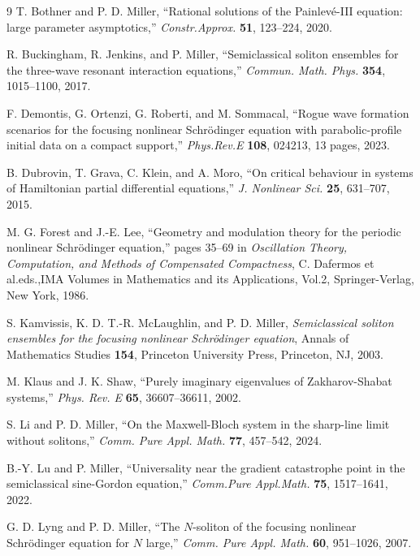 \documentclass[12pt]{amsart}
\numberwithin{equation}{section}
\begin{document}
\begin{thebibliography}{9}
T. Bothner and P. D. Miller,
``Rational solutions of the Painlev\'e-III equation:  large parameter asymptotics,''
\textit{Constr.\@ Approx.\@}
\textbf{51},
123--224,
2020.

R. Buckingham, R. Jenkins, and P. Miller, 
``Semiclassical soliton ensembles for the three-wave resonant interaction equations,''
\textit{Commun. Math. Phys.}
\textbf{354}, 1015--1100, 2017.

F. Demontis, G. Ortenzi, G. Roberti, and M. Sommacal,
``Rogue wave formation scenarios for the focusing nonlinear Schr\"odinger equation with parabolic-profile initial data on a compact support,''
\textit{Phys.\@ Rev.\@ E}
\textbf{108}, 
024213, 13 pages, 2023.

B. Dubrovin, T. Grava, C. Klein, and A. Moro, ``On critical behaviour in systems of Hamiltonian partial differential equations,'' \textit{J. Nonlinear Sci.\@} \textbf{25}, 631--707, 2015.

M. G. Forest and J.-E. Lee, ``Geometry and modulation theory for the periodic nonlinear Schr\"odinger equation,'' pages 35--69 in \textit{Oscillation Theory, Computation, and Methods of Compensated Compactness}, C. Dafermos et al.\@ eds.,\@ IMA Volumes in Mathematics and its Applications, Vol.\@ 2, Springer-Verlag, New York, 1986.

S. Kamvissis, K. D. T.-R. McLaughlin, and P. D. Miller, 
\textit{Semiclassical soliton ensembles for the focusing nonlinear Schr\"odinger equation},
Annals of Mathematics Studies 
\textbf{154},
Princeton University Press, 
Princeton, NJ, 
2003.

M. Klaus and J. K. Shaw, 
``Purely imaginary eigenvalues of Zakharov-Shabat systems,'' 
\textit{Phys. Rev. E} \textbf{65}, 36607--36611, 2002.

S. Li and P. D. Miller,
``On the Maxwell-Bloch system in the sharp-line limit without solitons,''
\textit{Comm. Pure Appl. Math.} \textbf{77}, 457--542, 2024.

B.-Y. Lu and P. Miller, ``Universality near the gradient catastrophe point in the semiclassical sine-Gordon equation,'' \textit{Comm.\@ Pure Appl.\@ Math.\@} \textbf{75}, 1517--1641, 2022.

G. D. Lyng and P. D. Miller, ``The $N$-soliton of the focusing nonlinear Schr\"odinger equation for $N$ large,'' \textit{Comm. Pure Appl. Math.} \textbf{60}, 951--1026, 2007.


\end{thebibliography}
\end{document}
